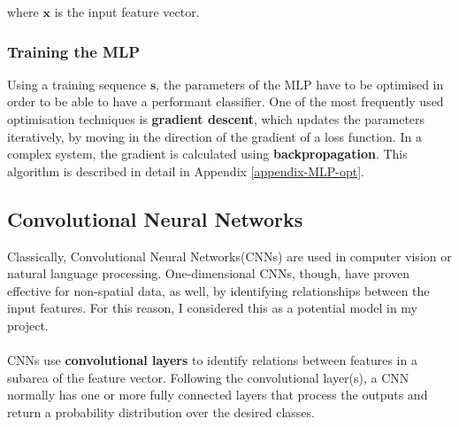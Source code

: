 	where $\mathbf{x}$ is the input feature vector.
	
	\subsubsection*{Training the MLP}
	Using a training sequence $\mathbf{s}$, the parameters of the MLP have to be optimised in order to be able to have a performant classifier. One of the most frequently used optimisation techniques is \textbf{gradient descent}, which updates the parameters iteratively, by moving in the direction of the gradient of a loss function. In a complex system, the gradient is calculated using \textbf{backpropagation}. This algorithm is described in detail in Appendix \ref{appendix-MLP-opt}. 
	
	\subsection{Convolutional Neural Networks} 
	Classically, Convolutional Neural Networks(CNNs) are used in computer vision or natural language processing. One-dimensional CNNs, though, have proven effective for non-spatial data, as well, by identifying relationships between the input features. For this reason, I considered this as a potential model in my project. 
	\\ \\
	CNNs use \textbf{convolutional layers} to identify relations between features in a subarea of the feature vector. Following the convolutional layer(s), a CNN normally has one or more fully connected layers that process the outputs and return a probability distribution over the desired classes.  
	
